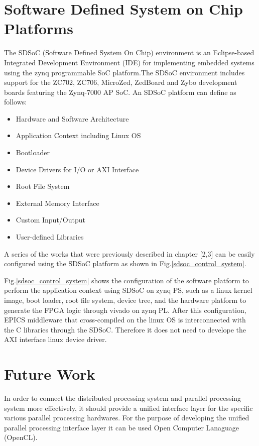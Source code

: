 \documentclass[journal]{IEEEtran}
\begin{document}
\section{Software Defined System on Chip Platforms}
The SDSoC (Software Defined System On Chip)\cite{sdsoc} environment is an Eclipse-based Integrated Development Environment (IDE) for implementing embedded systems using the zynq programmable SoC platform.The SDSoC environment includes support for the ZC702, ZC706, MicroZed, ZedBoard and Zybo development boards featuring the Zynq-7000 AP SoC.
\hfil\break\hfil\break
An SDSoC platform can define as follows:
\begin{itemize}
 	\item Hardware and Software Architecture
 	\item Application Context including Linux OS
 	\item Bootloader
 	\item Device Drivers for I/O or AXI Interface
 	\item Root File System
	\item External Memory Interface
	\item Custom Input/Output
	\item User-defined Libraries
\end{itemize}
A series of the works that were previously described in chapter [2,3] can be easily configured using the SDSoC platform as shown in Fig.\ref{sdsoc_control_system}. 

Fig.\ref{sdsoc_control_system} shows the configuration of the software platform to perform the application context using SDSoC on zynq PS, such as a linux kernel image, boot loader, root file system, device tree, and  the hardware platform to generate the FPGA logic through vivado on zynq PL. After this configuration, EPICS middleware that cross-compiled on the linux OS is interconnected with the C libraries through the SDSoC. Therefore it does not need to develope the AXI interface linux device driver.

\section{Future Work}
In order to connect the distributed processing system and parallel processing system more effectively, it should provide a unified interface layer for the specific various parallel processing hardwares. For the purpose of developing the unified parallel processing interface layer it can be used  Open Computer Lanaguage (OpenCL).
\end{document}
